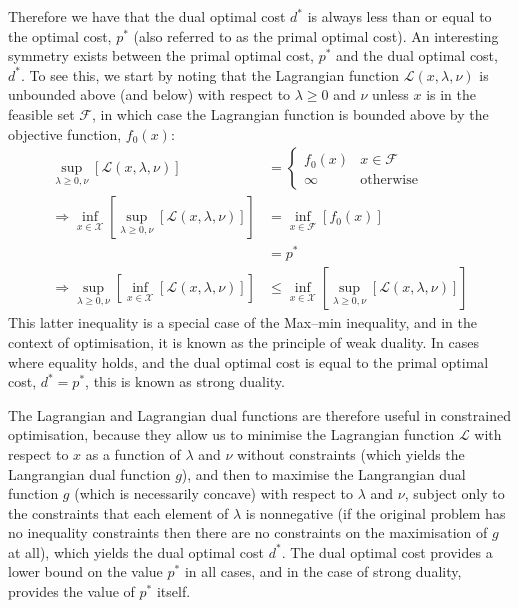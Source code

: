 Therefore we have that the dual optimal cost $d^*$ is always less than or equal to the optimal cost, $p^*$ (also referred to as the primal optimal cost). An interesting symmetry exists between the primal optimal cost, $p^*$ and the dual optimal cost, $d^*$. To see this, we start by noting that the Lagrangian function $\mathcal{L}(x, \lambda, \nu)$ is unbounded above (and below) with respect to $\lambda \ge 0$ and $\nu $ unless $x$ is in the feasible set $\mathcal{F}$, in which case the Lagrangian function is bounded above by the objective function, $f_0(x)$:
\begin{align}
    \underset{\lambda \ge 0, \nu}{\sup}\left[ \mathcal{L}(x, \lambda, \nu) \right] &= \begin{cases}
        f_0(x) & x \in \mathcal{F} \\
        \infty & \text{otherwise}
    \end{cases} \\
    \Rightarrow \underset{x\in\mathcal{X}}{\inf}\left[\underset{\lambda \ge 0, \nu}{\sup}\left[\mathcal{L}(x, \lambda, \nu)\right]\right] &= \underset{x\in\mathcal{F}}{\inf}\left[f_0(x)\right] \\
    &= p^* \\
    \Rightarrow \underset{\lambda \ge 0, \nu}{\sup}\left[\underset{x\in\mathcal{X}}{\inf}\left[\mathcal{L}(x, \lambda, \nu)\right]\right] &\le \underset{x\in\mathcal{X}}{\inf}\left[\underset{\lambda \ge 0, \nu}{\sup}\left[\mathcal{L}(x, \lambda, \nu)\right]\right]
\end{align}
This latter inequality is a special case of the Max–min inequality, and in the context of optimisation, it is known as the principle of weak duality. In cases where equality holds, and the dual optimal cost is equal to the primal optimal cost, $d^* = p^*$, this is known as strong duality.

The Lagrangian and Lagrangian dual functions are therefore useful in constrained optimisation, because they allow us to minimise the Lagrangian function $\mathcal{L}$ with respect to $x$ as a function of $\lambda$ and $\nu$ without constraints (which yields the Langrangian dual function $g$), and then to maximise the Langrangian dual function $g$ (which is necessarily concave) with respect to $\lambda$ and $\nu$, subject only to the constraints that each element of $\lambda$ is nonnegative (if the original problem has no inequality constraints then there are no constraints on the maximisation of $g$ at all), which yields the dual optimal cost $d^*$. The dual optimal cost provides a lower bound on the value $p^*$ in all cases, and in the case of strong duality, provides the value of $p^*$ itself.
